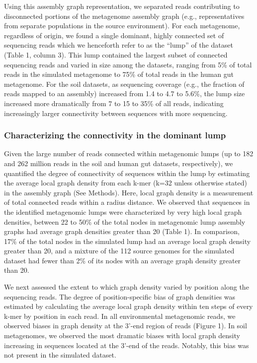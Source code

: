 \documentclass[10pt]{article}
\begin{document}
Using this assembly graph representation, we separated reads contributing to disconnected portions of the metagenome assembly graph (e.g., representatives from separate populations in the source environment).  For each metagenome, regardless of origin, we found a single dominant, highly connected set of sequencing reads which we henceforth refer to as the  ``lump''  of the dataset (Table 1, column 3).  This lump contained the largest subset of connected sequencing reads and varied in size among the datasets, ranging from 5\% of total reads in the simulated metagenome to 75\% of total reads in the human gut metagenome.  For the soil datasets, as sequencing coverage (e.g., the fraction of reads mapped to an assembly) increased from 1.4 to 4.7 to 5.6\%, the lump size increased more dramatically from 7 to 15 to 35\% of all reads, indicating increasingly larger connectivity between sequences with more sequencing.

\subsubsection*{Characterizing the connectivity in the dominant lump}

Given the large number of reads connected within metagenomic lumps (up to 182 and 262 million reads in the soil and human gut datasets, respectively), we quantified the degree of connectivity of sequences within the lump by estimating the average local graph density from each k-mer (k=32 unless otherwise stated) in the assembly graph (See Methods).  Here, local graph density is a measurement of total connected reads within a radius distance.  We observed that sequences in the identified metagenomic lumps were characterized by very high local graph densities, between 22 to 50\% of the total nodes in metagenomic lump assembly graphs had average graph densities greater than 20 (Table 1).  In comparison, 17\% of the total nodes in the simulated lump had an average local graph density greater than 20, and a mixture of the 112 source genomes for the simulated dataset had fewer than 2\% of its nodes with an average graph density greater than 20.  

We next assessed the extent to which graph density varied by position along the sequencing reads.  The degree of position-specific bias of graph densities was estimated by calculating the average local graph density within ten steps of every k-mer by position in each read.  In all environmental metagenomic reads, we observed biases in graph density at the 3'-end region of reads (Figure 1).  In soil metagenomes, we observed the most dramatic biases with local graph density increasing in sequences located at the 3'-end of the reads.  Notably, this bias was not present in the simulated dataset.  
\end{document}
